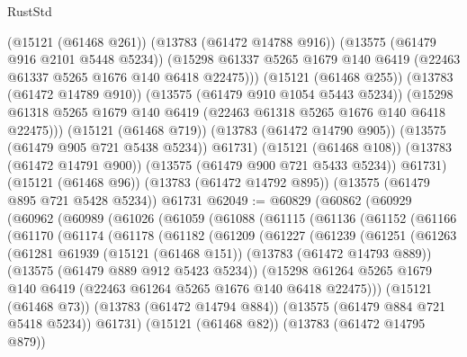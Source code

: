 \begin{lexlean}{RustStd}
\begin{coremodule}
            (@15121 (@61468 @261))
            (@13783 (@61472 @14788 @916))
            (@13575 (@61479 @916 @2101 @5448 @5234))
            (@15298 @61337 @5265 @1679 @140 @6419 (@22463 @61337 @5265 @1676 @140 @6418 @22475)))
          (@15121 (@61468 @255))
          (@13783 (@61472 @14789 @910))
          (@13575 (@61479 @910 @1054 @5443 @5234))
          (@15298 @61318 @5265 @1679 @140 @6419 (@22463 @61318 @5265 @1676 @140 @6418 @22475)))
        (@15121 (@61468 @719))
        (@13783 (@61472 @14790 @905))
        (@13575 (@61479 @905 @721 @5438 @5234))
        @61731)
      (@15121 (@61468 @108))
      (@13783 (@61472 @14791 @900))
      (@13575 (@61479 @900 @721 @5433 @5234))
      @61731)
    (@15121 (@61468 @96))
    (@13783 (@61472 @14792 @895))
    (@13575 (@61479 @895 @721 @5428 @5234))
    @61731
@62049 := @60829
    (@60862
      (@60929
        (@60962
          (@60989
            (@61026
              (@61059
                (@61088
                  (@61115
                    (@61136
                      (@61152
                        (@61166
                          (@61170
                            (@61174
                              (@61178
                                (@61182
                                  (@61209
                                    (@61227
                                      (@61239
                                        (@61251
                                          (@61263
                                            (@61281
                                              @61939
                                              (@15121 (@61468 @151))
                                              (@13783 (@61472 @14793 @889))
                                              (@13575 (@61479 @889 @912 @5423 @5234))
                                              (@15298
                                                @61264
                                                @5265
                                                @1679
                                                @140
                                                @6419
                                                (@22463 @61264 @5265 @1676 @140 @6418 @22475)))
                                            (@15121 (@61468 @73))
                                            (@13783 (@61472 @14794 @884))
                                            (@13575 (@61479 @884 @721 @5418 @5234))
                                            @61731)
                                          (@15121 (@61468 @82))
                                          (@13783 (@61472 @14795 @879))

\end{coremodule}
\end{lexlean}
